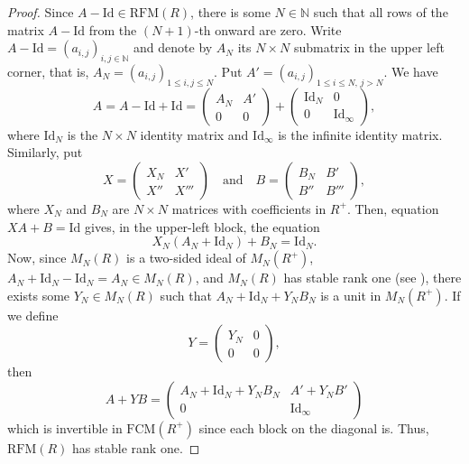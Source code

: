 \documentclass[11pt]{amsart}
\numberwithin{equation}{section}
\theoremstyle{definition}
\newcommand{\Id}{\mathrm{Id}}
\theoremstyle{plain}
\theoremstyle{definition}
\begin{document}
\begin{proof}
Since $A - \Id \in \mathrm{RFM}(R)$, there is some $N \in \mathbb{N}$ such that all rows of the matrix $A - \Id$ from the $(N+1)$-th onward are zero. Write $A - \Id = (a_{i,j})_{i,j \in \mathbb{N}}$ and denote by $A_N$ its $N \times N$ submatrix in the upper left corner, that is, $A_N = (a_{i,j})_{1 \leq i,j \leq N}$. Put $A' = (a_{i,j})_{1 \leq i \leq N,\, j > N}$. We have
\begin{equation*}
    A = A - \Id + \Id = \begin{pmatrix}
        A_N & A' \\
        0 & 0 
    \end{pmatrix} + \begin{pmatrix}
        \Id_N & 0 \\
        0 & \Id_{\infty}
    \end{pmatrix},
\end{equation*}
where $\Id_N$ is the $N \times N$ identity matrix and $\Id_\infty$ is the infinite identity matrix. Similarly, put
\begin{equation*}
    X = \begin{pmatrix}
        X_N & X' \\
        X'' & X''' 
    \end{pmatrix}\quad \text{and} \quad B = \begin{pmatrix}
        B_N & B' \\
        B'' & B''' 
    \end{pmatrix},
\end{equation*}
where $X_N$ and $B_N$ are $N \times N$ matrices with coefficients in $R^+$. Then, equation $XA + B = \mathrm{Id}$ gives, in the upper-left block, the equation
$$X_N (A_N + \mathrm{Id}_N) + B_N = \Id_N.$$ 
Now, since $M_N(R)$ is a two-sided ideal of $M_N(R^+)$, $A_N + \Id_N - \Id_N = A_N \in M_N(R)$, and $M_N(R)$ has stable rank one (see \cite[Theorem 3.6]{Vaserstein84StRangeCond}), there exists some $Y_N \in M_N(R)$ such that $A_N + \Id_N + Y_NB_N$ is a unit in $M_N(R^+)$. If we define
\begin{equation*}
    Y = \begin{pmatrix}
        Y_N & 0 \\
        0 & 0 
    \end{pmatrix},
\end{equation*}
then 
\begin{equation*}
    A + YB = \begin{pmatrix}
        A_N + \Id_N + Y_NB_N & A' + Y_NB' \\
        0 & \Id_\infty 
    \end{pmatrix}
\end{equation*}
which is invertible in $\mathrm{FCM}(R^+)$ since each block on the diagonal is. Thus, $\mathrm{RFM}(R)$ has stable rank one.
\end{proof}
\end{document}
